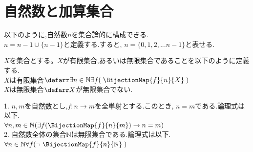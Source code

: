 \setcounter{section}{0}
\section{自然数と加算集合}
\label{section:自然数と加算集合}

\begin{definition}[p16]
	\label{definition:集合論的な自然数の定義}
	以下のように,自然数$n$を集合論的に構成できる.\\
	$n = n - 1 \cup \{n - 1\}$と定義する.すると,
	$n = \{0,1,2,... n-1\}と表せる.$
\end{definition}

\begin{definition}[p183の定義7.1.1]
	\label{definition:有限集合,無限集合の定義}
	$X$を集合とする。$X$が有限集合,あるいは無限集合であることを以下のように定義する.\\
	 $X$は有限集合$\defarr \exists n \in \mathbb{N}\exists f( \; \BijectionMap{f}{n}{X} \; )$\\
	 $X$は無限集合$\defarr X$が無限集合でない.\\
\end{definition}

\begin{proposition}[p184の命題7.1.2]
	1. $n,m$を自然数とし,$f:n \rightarrow m$を全単射とする.このとき,
	$n=m$である.論理式は以下.\\
	$\forall n ,m \in \mathbb{N} (\exists f(\BijectionMap{f}{n}{m}) \rightarrow n = m)$\\
	2. 自然数全体の集合$\mathbb{N}$は無限集合である.論理式は以下.\\
	$\forall n \in \mathbb{N} \forall f( \lnot \; \BijectionMap{f}{n}{\mathbb{N}} \; )$
\end{proposition}

